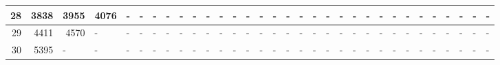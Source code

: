 \begin{appendices}
\begin{sidewaystable}
{\begin{tabular}{|r|r|r|r|r|r|r|r|r|r|r|r|r|r|r|r|r|l|l|l|l|l|l|l|l|l|l|l|l|l|l|l|}
28 & 3838 & 3955 & 4076 & \multicolumn{1}{l|}{-} & \multicolumn{1}{l|}{-} & \multicolumn{1}{l|}{-} & \multicolumn{1}{l|}{-} & \multicolumn{1}{l|}{-} & \multicolumn{1}{l|}{-} & \multicolumn{1}{l|}{-} & \multicolumn{1}{l|}{-} & \multicolumn{1}{l|}{-} & \multicolumn{1}{l|}{-} & \multicolumn{1}{l|}{-} & \multicolumn{1}{l|}{-} & \multicolumn{1}{l|}{-} & - & - & - & - & - & - & - & - & - & - & - & - & - & - & - \\ \hline
29 & 4411 & 4570 & \multicolumn{1}{l|}{-} & \multicolumn{1}{l|}{-} & \multicolumn{1}{l|}{-} & \multicolumn{1}{l|}{-} & \multicolumn{1}{l|}{-} & \multicolumn{1}{l|}{-} & \multicolumn{1}{l|}{-} & \multicolumn{1}{l|}{-} & \multicolumn{1}{l|}{-} & \multicolumn{1}{l|}{-} & \multicolumn{1}{l|}{-} & \multicolumn{1}{l|}{-} & \multicolumn{1}{l|}{-} & \multicolumn{1}{l|}{-} & - & - & - & - & - & - & - & - & - & - & - & - & - & - & - \\ \hline
30 & 5395 & \multicolumn{1}{l|}{-} & \multicolumn{1}{l|}{-} & \multicolumn{1}{l|}{-} & \multicolumn{1}{l|}{-} & \multicolumn{1}{l|}{-} & \multicolumn{1}{l|}{-} & \multicolumn{1}{l|}{-} & \multicolumn{1}{l|}{-} & \multicolumn{1}{l|}{-} & \multicolumn{1}{l|}{-} & \multicolumn{1}{l|}{-} & \multicolumn{1}{l|}{-} & \multicolumn{1}{l|}{-} & \multicolumn{1}{l|}{-} & \multicolumn{1}{l|}{-} & - & - & - & - & - & - & - & - & - & - & - & - & - & - & - \\ \hline
\end{tabular}
}
\end{sidewaystable}

\end{appendices}
